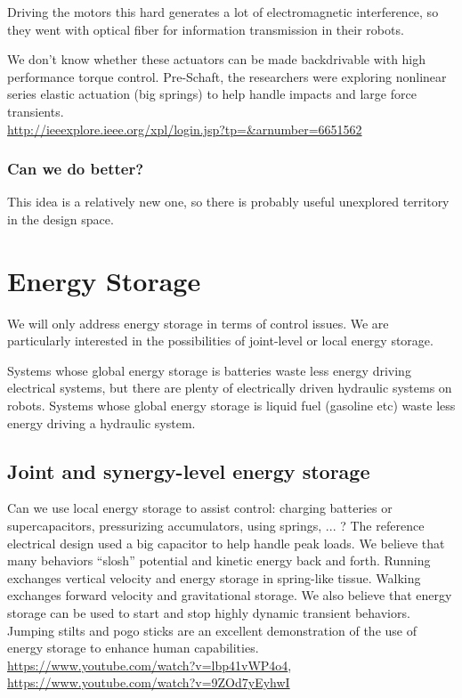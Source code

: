 \documentclass[letterpaper,12pt,fullpage]{article}
\begin{document}
Driving the motors this hard generates a lot of electromagnetic interference,
so they went with optical fiber for information transmission in their
robots.

We don't know whether these actuators can be made backdrivable with
high performance torque control. Pre-Schaft, the researchers were exploring
nonlinear series elastic actuation (big springs)
to help handle impacts and large force
transients.\\
\url{http://ieeexplore.ieee.org/xpl/login.jsp?tp=&arnumber=6651562}\\

\subsubsection{Can we do better?}

This idea is a relatively new one, so there is probably useful unexplored
territory in the design space.

\section{Energy Storage}

We will only address energy storage
in terms of control issues. We are particularly interested in the
possibilities of joint-level or local energy storage.

Systems whose global energy storage is batteries waste
less energy driving electrical systems, but there are plenty of electrically
driven hydraulic systems on robots.
Systems whose global energy storage is liquid fuel (gasoline etc)
waste less energy driving a hydraulic system.

\subsection{Joint and synergy-level energy storage}

Can we use local energy storage to assist control: charging batteries or
supercapacitors, pressurizing accumulators, using springs, ... ?
The reference electrical design used a big capacitor to help handle
peak loads. We believe that many behaviors ``slosh'' potential and
kinetic energy back and forth.
Running exchanges vertical velocity and energy storage in spring-like
tissue.
Walking exchanges forward velocity and gravitational storage.
We also believe that energy storage can be used to start and stop
highly dynamic transient behaviors.
Jumping stilts and pogo sticks are an excellent demonstration
of the use of energy storage to enhance human
capabilities.\\
\url{https://www.youtube.com/watch?v=lbp41vWP4o4},\\
\url{https://www.youtube.com/watch?v=9ZOd7yEyhwI}
\end{document}
